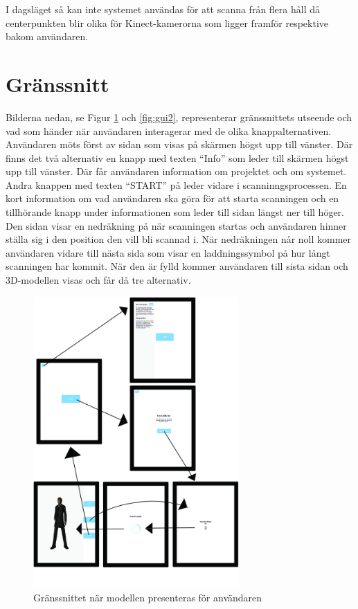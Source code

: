 \documentclass[a4paper,12pt,oneside,final]{extbook}
\begin{document}
I dagsläget så kan inte systemet användas för att scanna från flera håll då centerpunkten blir olika för Kinect-kamerorna som ligger framför respektive bakom användaren.

\section{Gränssnitt}
Bilderna nedan, se Figur \ref{fig:gui1} och \ref{fig:gui2}, representerar gränssnittets utseende och vad som händer när användaren interagerar med de olika knappalternativen. Användaren möts först av sidan som visas på skärmen högst upp till vänster. Där finns det två alternativ en knapp med texten “Info” som leder till skärmen högst upp till vänster. Där får användaren information om projektet och om systemet. Andra knappen med texten “START” på leder vidare i scanninngsprocessen. En kort information om vad användaren ska göra för att starta scanningen och en tillhörande knapp under informationen som leder till sidan längst ner till höger. Den sidan visar en nedräkning på när scanningen startas och användaren hinner ställa sig i den position den vill bli scannad i. När nedräkningen når noll kommer användaren vidare till nästa sida som visar en laddningssymbol på hur långt scanningen har kommit. När den är fylld kommer användaren till sista sidan och 3D-modellen visas och får då tre alternativ.


\begin{figure}[H]
  \centering
  \includegraphics[width=0.7\textwidth]{bilder/granssnitt.jpg}
  \caption{Gränssnittet när modellen presenteras för användaren}
  \label{fig:gui1}
\end{figure}
\end{document}
